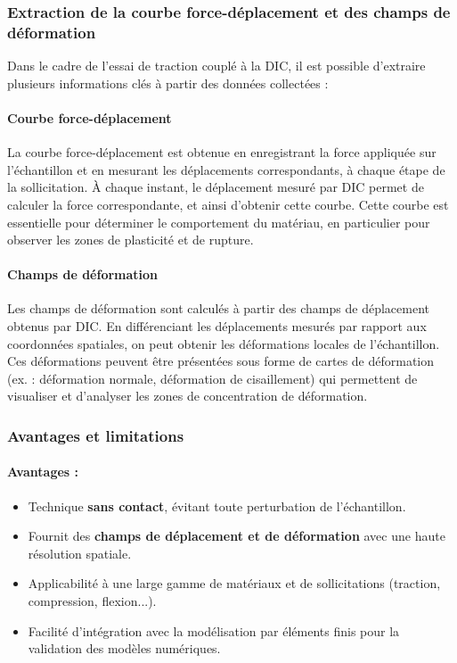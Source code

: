 \documentclass[12pt,a4paper]{article}
\begin{document}
\subsubsection{Extraction de la courbe force-déplacement et des champs de déformation}
Dans le cadre de l’essai de traction couplé à la DIC, il est possible d'extraire plusieurs informations clés à partir des données collectées :

\paragraph{Courbe force-déplacement}
La courbe force-déplacement est obtenue en enregistrant la force appliquée sur l’échantillon et en mesurant les déplacements correspondants, à chaque étape de la sollicitation. À chaque instant, le déplacement mesuré par DIC permet de calculer la force correspondante, et ainsi d'obtenir cette courbe. Cette courbe est essentielle pour déterminer le comportement du matériau, en particulier pour observer les zones de plasticité et de rupture.

\paragraph{Champs de déformation}
Les champs de déformation sont calculés à partir des champs de déplacement obtenus par DIC. En différenciant les déplacements mesurés par rapport aux coordonnées spatiales, on peut obtenir les déformations locales de l’échantillon. Ces déformations peuvent être présentées sous forme de cartes de déformation (ex. : déformation normale, déformation de cisaillement) qui permettent de visualiser et d’analyser les zones de concentration de déformation.

\subsubsection{Avantages et limitations}
\paragraph{Avantages :}
\begin{itemize}
    \item Technique \textbf{sans contact}, évitant toute perturbation de l’échantillon.
    \item Fournit des \textbf{champs de déplacement et de déformation} avec une haute résolution spatiale.
    \item Applicabilité à une large gamme de matériaux et de sollicitations (traction, compression, flexion...).
    \item Facilité d’intégration avec la modélisation par éléments finis pour la validation des modèles numériques.
\end{itemize}
\end{document}

